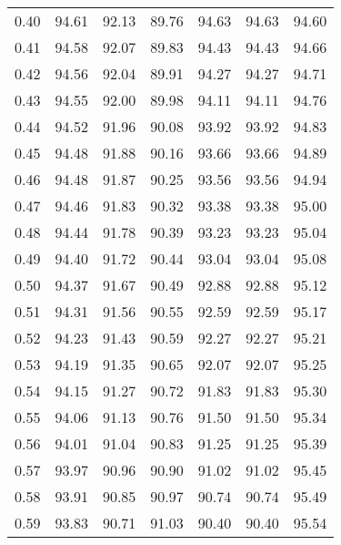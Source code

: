 \begin{tabular}{|c|c|c|c|c|c|c|}
      0.40 &     94.61 &     92.13 &      89.76 &   94.63 &      94.63 &         94.60 \\
      0.41 &     94.58 &     92.07 &      89.83 &   94.43 &      94.43 &         94.66 \\
      0.42 &     94.56 &     92.04 &      89.91 &   94.27 &      94.27 &         94.71 \\
      0.43 &     94.55 &     92.00 &      89.98 &   94.11 &      94.11 &         94.76 \\
      0.44 &     94.52 &     91.96 &      90.08 &   93.92 &      93.92 &         94.83 \\
      0.45 &     94.48 &     91.88 &      90.16 &   93.66 &      93.66 &         94.89 \\
      0.46 &     94.48 &     91.87 &      90.25 &   93.56 &      93.56 &         94.94 \\
      0.47 &     94.46 &     91.83 &      90.32 &   93.38 &      93.38 &         95.00 \\
      0.48 &     94.44 &     91.78 &      90.39 &   93.23 &      93.23 &         95.04 \\
      0.49 &     94.40 &     91.72 &      90.44 &   93.04 &      93.04 &         95.08 \\
      0.50 &     94.37 &     91.67 &      90.49 &   92.88 &      92.88 &         95.12 \\
      0.51 &     94.31 &     91.56 &      90.55 &   92.59 &      92.59 &         95.17 \\
      0.52 &     94.23 &     91.43 &      90.59 &   92.27 &      92.27 &         95.21 \\
      0.53 &     94.19 &     91.35 &      90.65 &   92.07 &      92.07 &         95.25 \\
      0.54 &     94.15 &     91.27 &      90.72 &   91.83 &      91.83 &         95.30 \\
      0.55 &     94.06 &     91.13 &      90.76 &   91.50 &      91.50 &         95.34 \\
      0.56 &     94.01 &     91.04 &      90.83 &   91.25 &      91.25 &         95.39 \\
      0.57 &     93.97 &     90.96 &      90.90 &   91.02 &      91.02 &         95.45 \\
      0.58 &     93.91 &     90.85 &      90.97 &   90.74 &      90.74 &         95.49 \\
      0.59 &     93.83 &     90.71 &      91.03 &   90.40 &      90.40 &         95.54 \\

\end{tabular}
